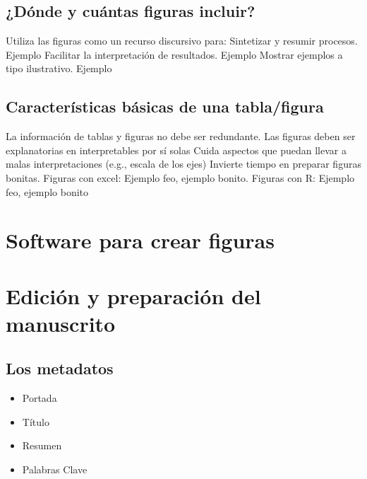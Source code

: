 \documentclass[
]{book}
\providecommand{\tightlist}{%
  \setlength{\itemsep}{0pt}\setlength{\parskip}{0pt}}
\begin{document}
\hypertarget{duxf3nde-y-cuuxe1ntas-figuras-incluir}{%
\section{¿Dónde y cuántas figuras incluir?}\label{duxf3nde-y-cuuxe1ntas-figuras-incluir}}

Utiliza las figuras como un recurso discursivo para:
Sintetizar y resumir procesos. Ejemplo
Facilitar la interpretación de resultados. Ejemplo
Mostrar ejemplos a tipo ilustrativo. Ejemplo

\hypertarget{caracteruxedsticas-buxe1sicas-de-una-tablafigura}{%
\section{Características básicas de una tabla/figura}\label{caracteruxedsticas-buxe1sicas-de-una-tablafigura}}

La información de tablas y figuras no debe ser redundante.
Las figuras deben ser explanatorias en interpretables por sí solas
Cuida aspectos que puedan llevar a malas interpretaciones (e.g., escala de los ejes)
Invierte tiempo en preparar figuras bonitas.
Figuras con excel: Ejemplo feo, ejemplo bonito.
Figuras con R: Ejemplo feo, ejemplo bonito

\hypertarget{software-para-crear-figuras}{%
\chapter{Software para crear figuras}\label{software-para-crear-figuras}}

\hypertarget{ediciuxf3n-y-preparaciuxf3n-del-manuscrito}{%
\chapter{Edición y preparación del manuscrito}\label{ediciuxf3n-y-preparaciuxf3n-del-manuscrito}}

\hypertarget{los-metadatos}{%
\section{Los metadatos}\label{los-metadatos}}

\begin{itemize}
\tightlist
\item
  Portada
\item
  Título
\item
  Resumen
\item
  Palabras Clave
\end{itemize}
\end{document}
